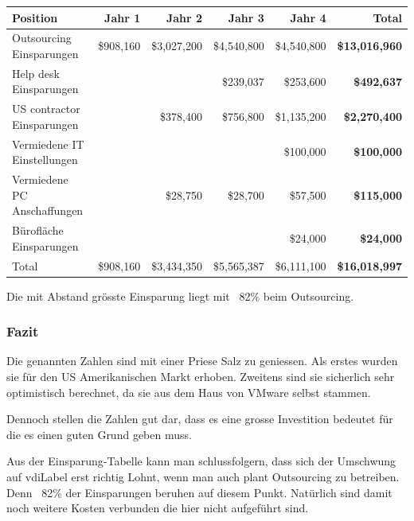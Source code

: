\begin{table}[H]
	\centering
	\small\renewcommand{\arraystretch}{1.4}  
	\begin{tabularx}{\textwidth}{X | r | r | r | r | r}
		\hline
		\rowcolor{tableheadcolor}
		\textbf{Position} & \textbf{Jahr 1} & \textbf{Jahr 2} & \textbf{Jahr 3} & \textbf{Jahr 4} & \textbf{Total} \\
		\hline
		Outsourcing Einsparungen & \$908,160 & \$3,027,200 & \$4,540,800 & \$4,540,800 & \textbf{\$13,016,960} \\
		Help desk Einsparungen &  &  & \$239,037 & \$253,600 & \textbf{\$492,637} \\
		US contractor Einsparungen &  & \$378,400 & \$756,800 & \$1,135,200 & \textbf{\$2,270,400} \\
		Vermiedene IT Einstellungen &  &  &  & \$100,000 & \textbf{\$100,000} \\
		Vermiedene PC Anschaffungen &  & \$28,750 & \$28,700 & \$57,500 & \textbf{\$115,000} \\
		Bürofläche Einsparungen &  &  &  & \$24,000 & \textbf{\$24,000} \\
		\hline
		\rowcolor{tableheadcolor}
		Total & \$908,160 & \$3,434,350 & \$5,565,387 & \$6,111,100 & \textbf{\$16,018,997} \\
	\end{tabularx}
\end{table}

Die mit Abstand grösste Einsparung liegt mit ~82\% beim Outsourcing.

\subsubsection{Fazit}
Die genannten Zahlen sind mit einer Priese Salz zu geniessen. Als erstes wurden sie für den US Amerikanischen Markt erhoben. Zweitens sind sie sicherlich sehr optimistisch berechnet, da sie aus dem Haus von VMware selbst stammen.

Dennoch stellen die Zahlen gut dar, dass es eine grosse Investition bedeutet für die es einen guten Grund geben muss.

Aus der Einsparung-Tabelle kann man schlussfolgern, dass sich der Umschwung auf \Gls{vdiLabel} erst richtig Lohnt, wenn man auch plant Outsourcing zu betreiben. Denn ~82\% der Einsparungen beruhen auf diesem Punkt. Natürlich sind damit noch weitere Kosten verbunden die hier nicht aufgeführt sind.

